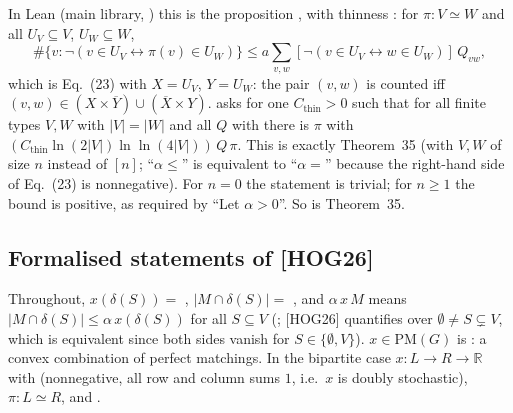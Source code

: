 In Lean (main library, ) this is the proposition
, with thinness : for $\pi:V\simeq W$ and all
$U_V\subseteq V$, $U_W\subseteq W$,
\[ \#\{v : \neg(v\in U_V\leftrightarrow\pi(v)\in U_W)\}\le a\sum_{v,w}[\neg(v\in U_V\leftrightarrow w\in U_W)]\,Q_{vw}, \]
which is Eq.~(23) with $X=U_V$, $Y=U_W$: the pair $(v,w)$ is counted iff $(v,w)\in(X\times\overline Y)\cup(\overline X\times Y)$.
 asks for one $C_{\mathrm{thin}}>0$ such that for all finite types $V,W$ with
$|V|=|W|$ and all $Q$ with  there is $\pi$ with  $(C_{\mathrm{thin}}\ln(2|V|)\ln\ln(4|V|))\,Q\,\pi$.
This is exactly Theorem~35 (with $V,W$ of size $n$ instead of $[n]$; ``$\alpha\le$'' is equivalent to ``$\alpha=$''
because the right-hand side of Eq.~(23) is nonnegative). For $n=0$ the statement is trivial; for $n\ge1$ the
bound is positive, as required by ``Let $\alpha>0$''. So  is Theorem~35.

\subsection{Formalised statements of [HOG26]}
Throughout, $x(\delta(S))=$ , $|M\cap\delta(S)|=$ , and
 $\alpha\,x\,M$ means $|M\cap\delta(S)|\le\alpha\,x(\delta(S))$ for all $S\subseteq V$
(; [HOG26] quantifies over $\emptyset\ne S\subsetneq V$, which is equivalent since both
sides vanish for $S\in\{\emptyset,V\}$). $x\in\mathrm{PM}(G)$ is : a convex combination of
perfect matchings. In the bipartite case $x:L\to R\to\mathbb R$ with  (nonnegative,
all row and column sums $1$, i.e.\ $x$ is doubly stochastic), $\pi:L\simeq R$, and .

